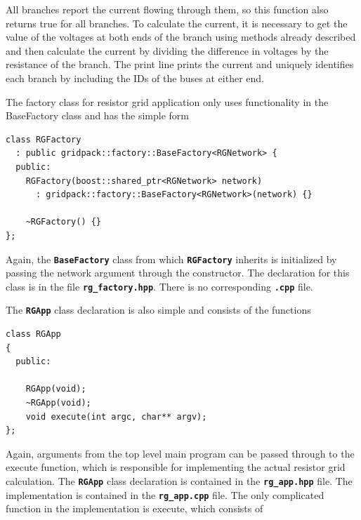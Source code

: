 All branches report the current flowing through them, so this function also returns true for all branches. To calculate the current, it is necessary to get the value of the voltages at both ends of the branch using methods already described and then calculate the current by dividing the difference in voltages by the resistance of the branch. The print line prints the current and uniquely identifies each branch by including the IDs of the buses at either end.

The factory class for resistor grid application only uses functionality in the BaseFactory class and has the simple form

{
\color{red}
\begin{Verbatim}[fontseries=b]
class RGFactory
  : public gridpack::factory::BaseFactory<RGNetwork> {
  public:
    RGFactory(boost::shared_ptr<RGNetwork> network)
      : gridpack::factory::BaseFactory<RGNetwork>(network) {}

    ~RGFactory() {}
};
\end{Verbatim}
}

Again, the \texttt{\textbf{BaseFactory}} class from which \texttt{\textbf{RGFactory}} inherits is initialized by passing the network argument through the constructor. The declaration for this class is in the file \texttt{\textbf{rg\_factory.hpp}}. There is no corresponding \texttt{\textbf{.cpp}} file.

The \texttt{\textbf{RGApp}} class declaration is also simple and consists of the functions

{
\color{red}
\begin{Verbatim}[fontseries=b]
class RGApp
{
  public:

    RGApp(void);
    ~RGApp(void);
    void execute(int argc, char** argv);
};
\end{Verbatim}
}

Again, arguments from the top level main program can be passed through to the execute function, which is responsible for implementing the actual resistor grid calculation. The \texttt{\textbf{RGApp}} class declaration is contained in the \texttt{\textbf{rg\_app.hpp}} file. The implementation is contained in the \texttt{\textbf{rg\_app.cpp}} file. The only complicated function in the implementation is execute, which consists of

